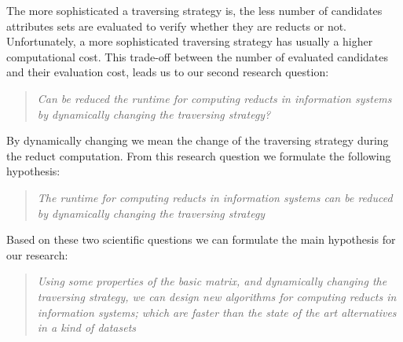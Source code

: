 \documentclass[authoryear,11pt]{elsarticle}
\begin{document}
%  
%
%    
  
  The more sophisticated a traversing strategy is, the less number of candidates attributes sets are 
  evaluated to verify whether they are reducts or not. Unfortunately, a more sophisticated traversing 
  strategy has usually a higher computational cost. This trade-off between the number of evaluated 
  candidates and their evaluation cost, leads us to our second research question:
  
\begin{quote}
  \emph{Can be reduced the runtime for computing reducts in information systems by 
  		dynamically changing the traversing strategy?}
\end{quote}
  By dynamically changing we mean the change of the traversing strategy during the reduct computation.
  From this research question we formulate the following hypothesis:
    
\begin{quote}
  \emph{The runtime for computing reducts in information systems can be reduced by 
  		dynamically changing the traversing strategy}
\end{quote}

  Based on these two scientific questions we can formulate the main hypothesis for our research:
  
\begin{quote}
  \emph{Using some properties of the basic matrix, and dynamically changing the traversing 
  		strategy, we can design new algorithms for computing reducts in information systems; which are
  		faster than the state of the art alternatives in a kind of datasets}
\end{quote}  
\end{document}
